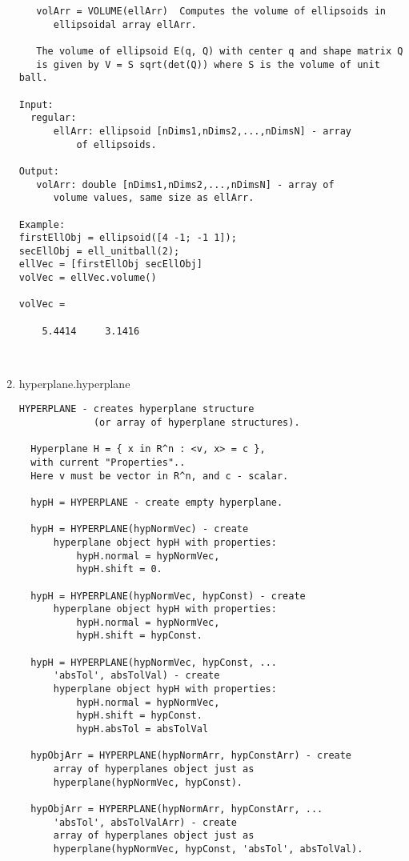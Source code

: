 \begin{enumerate}
\begin{lstlisting}
   volArr = VOLUME(ellArr)  Computes the volume of ellipsoids in
      ellipsoidal array ellArr.

   The volume of ellipsoid E(q, Q) with center q and shape matrix Q
   is given by V = S sqrt(det(Q)) where S is the volume of unit ball.

Input:
  regular:
      ellArr: ellipsoid [nDims1,nDims2,...,nDimsN] - array
          of ellipsoids.

Output:
   volArr: double [nDims1,nDims2,...,nDimsN] - array of
      volume values, same size as ellArr.

Example:
firstEllObj = ellipsoid([4 -1; -1 1]);
secEllObj = ell_unitball(2);
ellVec = [firstEllObj secEllObj]
volVec = ellVec.volume()

volVec =

    5.4414     3.1416



\end{lstlisting}
\fontfamily{\familydefault}
\selectfont
\item {hyperplane.hyperplane}
\selectfont
\begin{lstlisting}
HYPERPLANE - creates hyperplane structure
             (or array of hyperplane structures).

  Hyperplane H = { x in R^n : <v, x> = c },
  with current "Properties"..
  Here v must be vector in R^n, and c - scalar.

  hypH = HYPERPLANE - create empty hyperplane.

  hypH = HYPERPLANE(hypNormVec) - create
      hyperplane object hypH with properties:
          hypH.normal = hypNormVec,
          hypH.shift = 0.

  hypH = HYPERPLANE(hypNormVec, hypConst) - create
      hyperplane object hypH with properties:
          hypH.normal = hypNormVec,
          hypH.shift = hypConst.

  hypH = HYPERPLANE(hypNormVec, hypConst, ...
      'absTol', absTolVal) - create
      hyperplane object hypH with properties:
          hypH.normal = hypNormVec,
          hypH.shift = hypConst.
          hypH.absTol = absTolVal

  hypObjArr = HYPERPLANE(hypNormArr, hypConstArr) - create
      array of hyperplanes object just as
      hyperplane(hypNormVec, hypConst).

  hypObjArr = HYPERPLANE(hypNormArr, hypConstArr, ...
      'absTol', absTolValArr) - create
      array of hyperplanes object just as
      hyperplane(hypNormVec, hypConst, 'absTol', absTolVal).


\end{lstlisting}
\end{enumerate}
